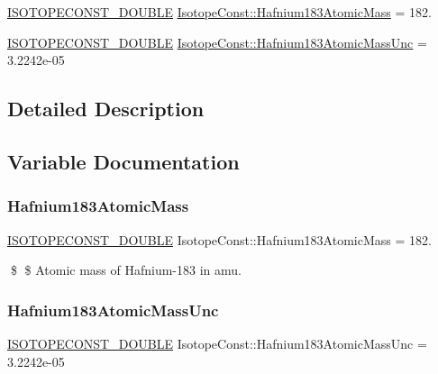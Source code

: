 \begin{DoxyCompactItemize}
\item 
\mbox{\hyperlink{group___isotope_const-_macros_ga8f45a7272ce02c0b4c65c44636ed719a}{I\+S\+O\+T\+O\+P\+E\+C\+O\+N\+S\+T\+\_\+\+D\+O\+U\+B\+LE}} \mbox{\hyperlink{group___isotope_const-_hafnium-_hf183_ga322074c3ebe0df47a96be5c7384f9727}{Isotope\+Const\+::\+Hafnium183\+Atomic\+Mass}} = 182.
\item 
\mbox{\hyperlink{group___isotope_const-_macros_ga8f45a7272ce02c0b4c65c44636ed719a}{I\+S\+O\+T\+O\+P\+E\+C\+O\+N\+S\+T\+\_\+\+D\+O\+U\+B\+LE}} \mbox{\hyperlink{group___isotope_const-_hafnium-_hf183_ga4749db15ba2f82ca41cf4712932d048a}{Isotope\+Const\+::\+Hafnium183\+Atomic\+Mass\+Unc}} = 3.\+2242e-\/05
\end{DoxyCompactItemize}


\subsection{Detailed Description}


\subsection{Variable Documentation}
\mbox{\label{group___isotope_const-_hafnium-_hf183_ga322074c3ebe0df47a96be5c7384f9727}} 
\subsubsection{\texorpdfstring{Hafnium183\+Atomic\+Mass}{Hafnium183AtomicMass}}
{\footnotesize\ttfamily \mbox{\hyperlink{group___isotope_const-_macros_ga8f45a7272ce02c0b4c65c44636ed719a}{I\+S\+O\+T\+O\+P\+E\+C\+O\+N\+S\+T\+\_\+\+D\+O\+U\+B\+LE}} Isotope\+Const\+::\+Hafnium183\+Atomic\+Mass = 182.}

\$ \$ Atomic mass of Hafnium-\/183 in amu. \mbox{\label{group___isotope_const-_hafnium-_hf183_ga4749db15ba2f82ca41cf4712932d048a}} 
\subsubsection{\texorpdfstring{Hafnium183\+Atomic\+Mass\+Unc}{Hafnium183AtomicMassUnc}}
{\footnotesize\ttfamily \mbox{\hyperlink{group___isotope_const-_macros_ga8f45a7272ce02c0b4c65c44636ed719a}{I\+S\+O\+T\+O\+P\+E\+C\+O\+N\+S\+T\+\_\+\+D\+O\+U\+B\+LE}} Isotope\+Const\+::\+Hafnium183\+Atomic\+Mass\+Unc = 3.\+2242e-\/05}

